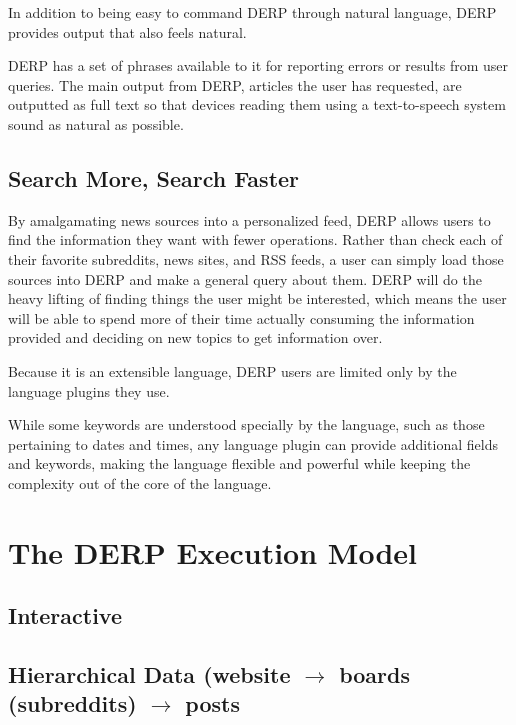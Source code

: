 \documentclass{article}
\begin{document}
In addition to being easy to command DERP through natural language, DERP provides output that also feels natural.
\begin{comment}
@ADS - Is this something we're actually doing? We've kind of had it implied
in discussions, but never explicitly talked about it
\end{comment}
DERP has a set of phrases available to it for reporting errors or results from user queries. The main output from DERP, articles the user has requested, are outputted as full text so that devices reading them using a text-to-speech system sound as natural as possible.

\subsection{Search More, Search Faster}
By amalgamating news sources into a personalized feed, DERP allows users to find the information they want with fewer operations. Rather than check each of their favorite subreddits, news sites, and RSS feeds, a user can simply load those sources into DERP and make a general query about them. DERP will do the heavy lifting of finding things the user might be interested, which means the user will be able to spend more of their time actually consuming the information provided and deciding on new topics to get information over.

Because it is an extensible language, DERP users are limited only by the language plugins they use. 
\begin{comment}
@ADS Is this also something we officially decided on? I felt that we were leaning toward it
\end{comment}
While some keywords are understood specially by the language, such as those pertaining to dates and times, any language plugin can provide additional fields and keywords, making the language flexible and powerful while keeping the complexity out of the core of the language.


\newpage
\section{\textbf{The DERP Execution Model}}
\subsection{Interactive}
\subsection{Hierarchical Data (website $\rightarrow$ boards (subreddits) $\rightarrow$ posts}
\end{document}

